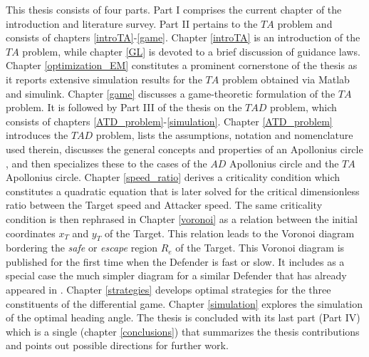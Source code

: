\bigskip 

This thesis consists of four parts. Part I comprises the current chapter of the introduction and literature survey. Part II pertains to the $ TA $ problem and consists of chapters \ref{introTA}-\ref{game}. Chapter \ref{introTA} is an introduction of the $ TA $ problem, while chapter \ref{GL} is devoted to a brief discussion of guidance laws. Chapter \ref{optimization_EM} constitutes a prominent cornerstone of the thesis as it reports extensive simulation results for the $ TA $ problem obtained via Matlab and simulink. Chapter \ref{game} discusses a game-theoretic formulation of the $ TA $ problem. It is followed by Part III of the thesis on the $ TAD $ problem, which consists of chapters \ref{ATD_problem}-\ref{simulation}. Chapter \ref{ATD_problem} introduces the $ TAD $ problem, lists the assumptions, notation and nomenclature used therein, discusses the general concepts and properties of an Apollonius circle \cite{ayoub2003proving,ayoub2006circle,partensky2008circle,fulton2015conflict}, and then specializes these to the cases of the $AD$ Apollonius circle and the $TA$ Apollonius circle. Chapter \ref{speed_ratio} derives a criticality condition which constitutes a quadratic equation that is later solved for the critical dimensionless ratio between the Target speed and Attacker speed. The same criticality condition is then rephrased in Chapter \ref{voronoi} as a relation between the initial coordinates $x_T$ and $y_T$ of the Target. This relation leads to the Voronoi diagram bordering the \textit{safe} or \textit{escape} region $R_e$ of the Target. This Voronoi diagram is published for the first time when the Defender is fast or slow. It includes as a special case the much simpler diagram for a similar Defender that has already appeared in \cite{garcia2015escape}. Chapter \ref{strategies} develops optimal strategies for the three constituents of the differential game. Chapter \ref{simulation} explores the simulation of the optimal heading angle. The thesis is concluded with its last part (Part IV) which is a single (chapter \ref{conclusions}) that summarizes the thesis contributions and points out possible directions for further work. 

